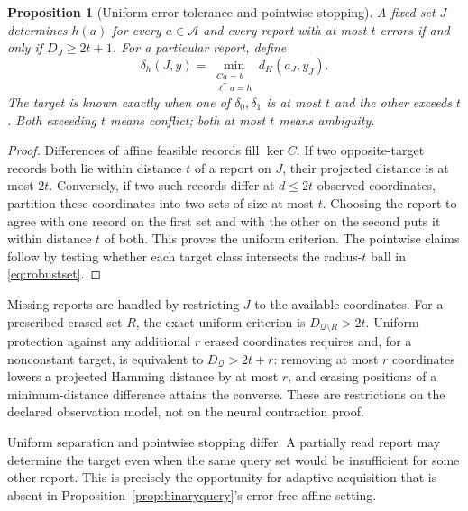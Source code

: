 \documentclass[11pt,a4paper]{article}
\newtheorem{proposition}[theorem]{Proposition}
\theoremstyle{definition}\newtheorem{definition}[theorem]{Definition}
\begin{document}
\begin{proposition}[Uniform error tolerance and pointwise stopping]\label{prop:robustdistance}
A fixed set $J$ determines $h(a)$ for every $a\in\mathcal A$ and every report with at most $t$ errors if and only if $D_J\geq2t+1$. For a particular report, define
\begin{equation}
 \delta_h(J,y)=\min_{\substack{Ca=b\\\ell^{\mathsf T}a=h}}d_H(a_J,y_J).
 \label{eq:pointdistance}
\end{equation}
The target is known exactly when one of $\delta_0,\delta_1$ is at most $t$ and the other exceeds $t$. Both exceeding $t$ means conflict; both at most $t$ means ambiguity.
\end{proposition}
\begin{proof}
Differences of affine feasible records fill $\ker C$. If two opposite-target records both lie within distance $t$ of a report on $J$, their projected distance is at most $2t$. Conversely, if two such records differ at $d\leq2t$ observed coordinates, partition these coordinates into two sets of size at most $t$. Choosing the report to agree with one record on the first set and with the other on the second puts it within distance $t$ of both. This proves the uniform criterion. The pointwise claims follow by testing whether each target class intersects the radius-$t$ ball in \eqref{eq:robustset}.
\end{proof}

Missing reports are handled by restricting $J$ to the available coordinates. For a prescribed erased set $R$, the exact uniform criterion is $D_{\mathcal Q\setminus R}>2t$. Uniform protection against any additional $r$ erased coordinates requires and, for a nonconstant target, is equivalent to $D_{\mathcal Q}>2t+r$: removing at most $r$ coordinates lowers a projected Hamming distance by at most $r$, and erasing positions of a minimum-distance difference attains the converse. These are restrictions on the declared observation model, not on the neural contraction proof.

Uniform separation and pointwise stopping differ. A partially read report may determine the target even when the same query set would be insufficient for some other report. This is precisely the opportunity for adaptive acquisition that is absent in Proposition~\ref{prop:binaryquery}'s error-free affine setting.
\end{document}

